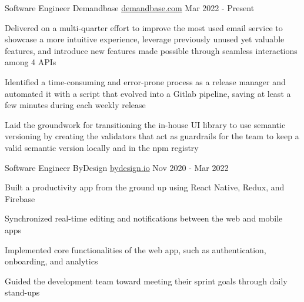 

\begin{cventries}

\cventry
{Software Engineer} %
{Demandbase} %
{\href{https://www.demandbase.com/}{demandbase.com}} %
{Mar 2022 - Present} %
{
  \begin{cvitems} %
    \item {Delivered on a multi-quarter effort to improve the most used email service to showcase a more intuitive experience, leverage previously unused yet valuable features, and introduce new features made possible through seamless interactions among 4 APIs}
    \item {Identified a time-consuming and error-prone process as a release manager and automated it with a script that evolved into a Gitlab pipeline, saving at least a few minutes during each weekly release}
    \item {Laid the groundwork for transitioning the in-house UI library to use semantic versioning by creating the validators that act as guardrails for the team to keep a valid semantic version locally and in the npm registry}
  \end{cvitems}
}

\cventry
{Software Engineer} %
{ByDesign} %
{\href{https://bydesign.io}{bydesign.io}} %
{Nov 2020 - Mar 2022} %
{
  \begin{cvitems} %
    \item {Built a productivity app from the ground up using React Native, Redux, and Firebase}
    \item {Synchronized real-time editing and notifications between the web and mobile apps}
    \item {Implemented core functionalities of the web app, such as authentication, onboarding, and analytics}
    \item {Guided the development team toward meeting their sprint goals through daily stand-ups}
  \end{cvitems}
}


\end{cventries}
